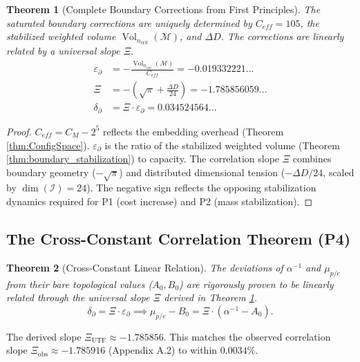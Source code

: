 \documentclass[11pt, a4paper]{article}
\newtheorem{theorem}{Theorem}[section]
\theoremstyle{definition}
\theoremstyle{definition}
\newcommand{\M}{\mathcal{M}}
\newcommand{\Ical}{\mathcal{I}}
\newcommand{\Vol}{\operatorname{Vol}}
\newcommand{\VolNcrit}{\Vol_{\ncrit}}
\newcommand{\ncrit}{n_{\mathrm{crit}}}
\begin{document}
\begin{theorem}[Complete Boundary Corrections from First Principles]\label{thm:boundary}
The saturated boundary corrections are uniquely determined by $C_{eff}=105$, the stabilized weighted volume $\VolNcrit(\M)$, and $\Delta D$. The corrections are linearly related by a universal slope $\Xi$.
\begin{align}
\varepsilon_\partial &= -\frac{\VolNcrit(\M)}{C_{eff}} = -0.019332221... \label{eq:epsilon} \\
\Xi &= -\left(\sqrt{\pi} + \frac{\Delta D}{24}\right) = -1.785856059... \label{eq:Xi} \\
\delta_\partial &= \Xi \cdot \varepsilon_\partial = 0.034524564... \label{eq:delta}
\end{align}
\end{theorem}

\begin{proof}
$C_{eff} = C_M - 2^5$ reflects the embedding overhead (Theorem \ref{thm:ConfigSpace}). $\varepsilon_\partial$ is the ratio of the stabilized weighted volume (Theorem \ref{thm:boundary_stabilization}) to capacity. The correlation slope $\Xi$ combines boundary geometry ($-\sqrt{\pi}$) and distributed dimensional tension ($-\Delta D/24$, scaled by $\dim(\Ical)=24$). The negative sign reflects the opposing stabilization dynamics required for P1 (cost increase) and P2 (mass stabilization).
\end{proof}

\subsection{The Cross-Constant Correlation Theorem (P4)}

\begin{theorem}[Cross-Constant Linear Relation]\label{thm:XiSlope}
The deviations of $\alpha^{-1}$ and $\mu_{p/e}$ from their bare topological values ($A_0, B_0$) are rigorously proven to be linearly related through the universal slope $\Xi$ derived in Theorem \ref{thm:boundary}.
\begin{equation}
    \delta_\partial = \Xi \cdot \varepsilon_\partial \implies \mu_{p/e} - B_0 = \Xi \cdot (\alpha^{-1} - A_0).
\end{equation}
\end{theorem}
The derived slope $\Xi_{\text{UTF}} \approx -1.785856$. This matches the observed correlation slope $\Xi_{\text{obs}} \approx -1.785916$ (Appendix A.2) to within $0.0034\%$.
\end{document}
